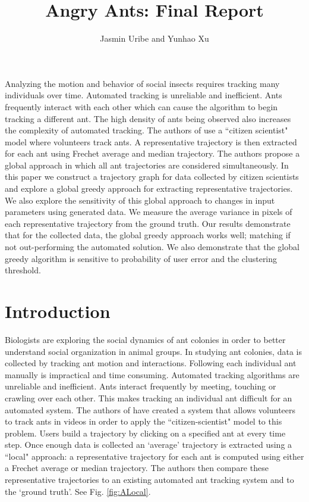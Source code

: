 \documentclass[12pt]{article}
\begin{document}
\title{Angry Ants: Final Report}
\author{Jasmin Uribe and Yunhao Xu}
\maketitle
\abstract Analyzing the motion and behavior of social insects requires tracking many individuals over time. Automated tracking is unreliable and inefficient. Ants frequently interact with each other which can cause the algorithm to begin tracking a different ant. The high density of ants being observed also increases the complexity of automated tracking. The authors of \cite{Joy12} use a ``citizen scientist" model where volunteers track ants. A representative trajectory is then extracted for each ant using Frechet average and median trajectory. The authors propose a global approach in which all ant trajectories are considered simultaneously. In this paper we construct a trajectory graph for data collected by citizen scientists and explore a global greedy approach for extracting representative trajectories.  We also explore the sensitivity of this global approach to changes in input parameters using generated data. We measure the average variance in pixels of each representative trajectory from the ground truth. Our results demonstrate that for the collected data, the global greedy approach works well; matching if not out-performing the automated solution. We also demonstrate that the global greedy algorithm is sensitive to probability of user error and the clustering threshold.

\section{Introduction}
\indent Biologists are exploring the social dynamics of ant colonies in order to better understand social organization in animal groups. In studying ant colonies, data is collected by tracking ant motion and interactions. Following each individual ant manually is impractical and time consuming. Automated tracking algorithms are unreliable and inefficient. Ants interact frequently by meeting, touching or crawling over each other. This makes tracking an individual ant difficult for an automated system. 
\indent The authors of \cite{Joy12} have created a system that allows volunteers to track ants in videos in order to apply the ``citizen-scientist" model to this problem. Users build a trajectory by clicking on a specified ant at every time step. Once enough data is collected an `average' trajectory is extracted using a ``local" approach: a representative trajectory for each ant is computed using either a Frechet average or median trajectory. The authors then compare these representative trajectories to an existing automated ant tracking system and to the `ground truth'. See Fig. \ref{fig:ALocal}.
\end{document}
